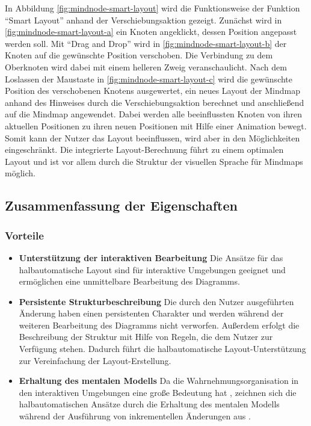 In Abbildung \ref{fig:mindnode-smart-layout} wird die Funktionsweise der Funktion \enquote{Smart Layout} anhand der Verschiebungsaktion gezeigt. Zunächst wird in \ref{fig:mindnode-smart-layout-a} ein Knoten angeklickt, dessen Position angepasst werden soll. Mit \enquote{Drag and Drop} wird in \ref{fig:mindnode-smart-layout-b} der Knoten auf die gewünschte Position verschoben. Die Verbindung zu dem Oberknoten wird dabei mit einem helleren Zweig veranschaulicht. Nach dem Loslassen der Maustaste in \ref{fig:mindnode-smart-layout-c} wird die gewünschte Position des verschobenen Knotens ausgewertet, ein neues Layout der Mindmap anhand des Hinweises durch die Verschiebungsaktion berechnet und anschließend auf die Mindmap angewendet. Dabei werden alle beeinflussten Knoten von ihren aktuellen Positionen zu ihren neuen Positionen mit Hilfe einer Animation bewegt. Somit kann der Nutzer das Layout beeinflussen, wird aber in den Möglichkeiten eingeschränkt. Die integrierte Layout-Berechnung führt zu einem optimalen Layout und ist vor allem durch die Struktur der visuellen Sprache für Mindmaps möglich.


\subsection{Zusammenfassung der Eigenschaften}

\subsubsection{Vorteile}

\begin{itemize}

\item
\textbf{Unterstützung der interaktiven Bearbeitung}
Die Ansätze für das halbautomatische Layout sind für interaktive Umgebungen geeignet und ermöglichen eine unmittelbare Bearbeitung des Diagramms.

\item
\textbf{Persistente Strukturbeschreibung}
Die durch den Nutzer ausgeführten Änderung haben einen persistenten Charakter und werden während der weiteren Bearbeitung des Diagramms nicht verworfen. Außerdem erfolgt die Beschreibung der Struktur mit Hilfe von Regeln, die dem Nutzer zur Verfügung stehen. Dadurch führt die halbautomatische Layout-Unterstützung zur Vereinfachung der Layout-Erstellung.

\item
\textbf{Erhaltung des mentalen Modells}
Da die Wahrnehmungsorganisation in den interaktiven Umgebungen eine große Bedeutung hat \cite{ShieberKosak93Automating, Maier12A-Pattern-based}, zeichnen sich die halbautomatischen Ansätze durch die Erhaltung des mentalen Modells während der Ausführung von inkrementellen Änderungen aus \cite{GladischSchumann14Semi-Automatic}.

\end{itemize}


